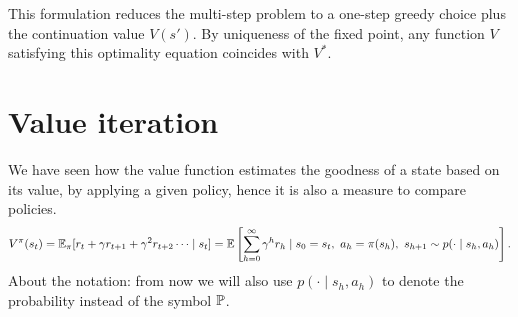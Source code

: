 \documentclass[10pt, a4paper]{report}
\begin{document}
This formulation reduces the multi-step problem to a one-step greedy choice plus the continuation value $V(s')$. By uniqueness of the fixed point, any function $V$ satisfying this optimality equation coincides with $V^*$.
\section{Value iteration}
We have seen how the value function estimates the goodness of a state based on its value, by applying a given policy, hence it is also a measure to compare policies.\begin{equation}
    V^\pi(s_t)={\mathbb E}_\pi[r_t+\gamma r_{t+1}+\gamma^2 r_{t+2}\dots\mid s_t]={\mathbb E}\left[
        \sum_{h=0}^{\infty}\gamma^hr_{h}\mid  
        s_0=s_t,\ a_h=\pi(s_h),\ s_{h+1}\sim p(\cdot\mid s_h,a_h)
    \right].
\end{equation}
\noindent About the notation: from now we will also use $p(\cdot\mid s_h,a_h)$ to denote the probability instead of the symbol ${\mathbb P}$.
\end{document}
